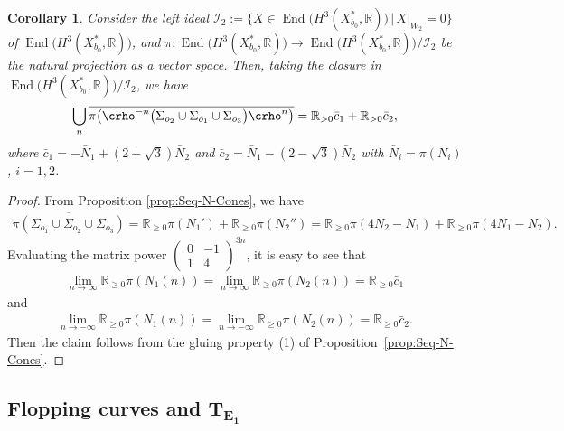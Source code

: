 \documentclass[10pt,a4paper]{amsart}
\numberwithin{equation}{section}
\newtheorem{Corollary}[Theorem]{Corollary}
\begin{document}
\begin{Corollary}\label{cor:XpartI} Consider the left ideal $\mathcal{I}_{2}:=\big\{ X\in\operatorname{End}\big(H^{3}(X_{b_{0}}^{*},\mathbb{R})\big)\,|\, X\vert_{W_{2}}=0\big\} $
of \linebreak $\operatorname{End}\big(H^{3}(X_{b_{0}}^{*},\mathbb{R})\big)$, and $\pi\colon\operatorname{End}\big(H^{3}(X_{b_{0}}^{*},\mathbb{R})\big)\to\operatorname{End}\big(H^{3}(X_{b_{0}}^{*},\mathbb{R})\big)/\mathcal{I}_{2}$
be the natural projection as a vector space. Then, taking the closure in $\operatorname{End}\big(H^{3}(X_{b_{0}}^{*},\mathbb{R})\big)/\mathcal{I}_{2}$, we have
\begin{gather*}
\bigcup_{n}\overline{\pi\big(\crho^{-n}\big(\Sigma_{o_{2}}\cup\Sigma_{o_{1}}\cup\Sigma_{o_{3}}\big)\crho^{n}\big)}=\mathbb{R}_{>0} \bar{c}_{1}+\mathbb{R}_{>0} \bar{c}_{2},
\end{gather*}
where $\bar{c}_{1}=-\bar{N}_{1}+(2+\sqrt{3})\bar{N}_{2}$ and $\bar{c}_{2}=\bar{N}_{1}-(2-\sqrt{3})\bar{N}_{2}$ with $\bar{N}_{i}=\pi(N_{i})$, $i=1,2$. \end{Corollary}
\begin{proof}
From Proposition \ref{prop:Seq-N-Cones}, we have
\begin{gather*}
\overline{\pi\left(\Sigma_{o_{1}}\cup\Sigma_{o_{2}}\cup\Sigma_{o_{3}}\right)} =\mathbb{R}_{\geq0}\pi(N_{1}')+\mathbb{R}_{\geq0}\pi(N_{2}'')
 =\mathbb{R}_{\geq0}\pi(4N_{2}-N_{1})+\mathbb{R}_{\geq0}\pi(4N_{1}-N_{2}).
\end{gather*}
Evaluating the matrix power $\left(\begin{smallmatrix}0 & -1\\
1 & 4\end{smallmatrix}\right)^{3n}$, it is easy to see that
\begin{gather*}
\lim_{n\to\infty}\mathbb{R}_{\geq0}\pi(N_{1}(n))=\lim_{n\to\infty}\mathbb{R}_{\geq0}\pi(N_{2}(n))=\mathbb{R}_{\geq0} \bar{c}_{1}
\end{gather*}
and
\begin{gather*}
\lim_{n\to-\infty}\mathbb{R}_{\geq0}\pi(N_{1}(n))=\lim_{n\to-\infty}\mathbb{R}_{\geq0}\pi(N_{2}(n))=\mathbb{R}_{\geq0} \bar{c}_{2}.
\end{gather*}
Then the claim follows from the gluing property (1) of Proposition~\ref{prop:Seq-N-Cones}.
\end{proof}

\subsection[Flopping curves and $T_{E_{1}}$]{Flopping curves and $\boldsymbol{T_{E_{1}}}$} \label{sub:TE1-Reye}
\end{document}
